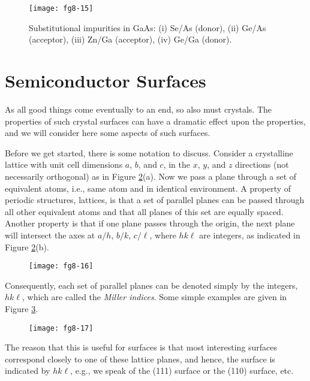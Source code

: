 \begin{figure}
\begin{center}
\texttt{[image: fg8-15]}
\end{center}
\caption{Substitutional impurities in GaAs: (i) Se/As (donor), (ii)
Ge/As (acceptor), (iii) Zn/Ga (acceptor), (iv) Ge/Ga (donor).}
\label{chap8-fig15}
\end{figure}

\section{Semiconductor Surfaces}

As all good things come eventually to an end, so also must crystals. The 
properties of such crystal surfaces can have a dramatic effect upon the 
properties, and we will consider here some aspects of such surfaces.

Before we get started, there is some notation to discuss. Consider a
crystalline lattice with unit cell dimensions $a$, $b$, and $c$, in
the $x$, $y$, and $z$ directions (not necessarily orthogonal) as in
Figure \ref{chap8-fig16}(a).  Now we pass a plane through a set of
equivalent atoms, i.e., same atom and in identical environment.  A
property of periodic structures, lattices, is that a set of parallel
planes can be passed through all other equivalent atoms and that all
planes of this set are equally spaced.  Another property is that if
one plane passes through the origin, the next plane will intersect the
axes at $a/h$, $b/k$, $c/\ell$, where $hk\ell$ are integers, as
indicated in Figure \ref{chap8-fig16}(b).  

\begin{figure}
\begin{center}
\texttt{[image: fg8-16]}
\end{center}
\caption{}
\label{chap8-fig16}
\end{figure}


Consequently, each set of parallel planes can be denoted simply by the
integers, $hk \ell$, which are called the \emph{Miller indices}. Some
simple examples are given in Figure \ref{chap8-fig17}.

\begin{figure}
\begin{center}
\texttt{[image: fg8-17]}
\end{center}
\caption{}
\label{chap8-fig17}
\end{figure}

The reason that this is useful for surfaces is that most interesting 
surfaces correspond closely to one of these lattice planes, and hence, 
the surface is indicated by $hk \ell$, e.g., we speak of the (111) 
surface or the (110) surface, etc.

